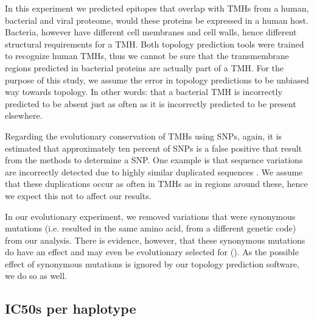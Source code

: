 In this experiment we predicted epitopes that overlap with 
TMHs from a human, bacterial and viral proteome,
would these proteins be expressed in a human host.
Bacteria, however have different cell membranes and cell walls, 
hence different structural requirements for a TMH.
Both topology prediction tools were trained to recognize
human TMHs, thus we cannot be sure that
the transmembrane regions predicted in bacterial proteins
are actually part of a TMH.
For the purpose of this study, we assume the 
error in topology predictions to be unbiased way towards topology.
In other words: that a bacterial TMH is incorrectly
predicted to be absent just as often as it is incorrectly
predicted to be present elsewhere.


Regarding the evolutionary conservation of TMHs using SNPs,
again, it is estimated that approximately ten percent
of SNPs is a false positive that result from the methods to determine
a SNP. One example is that sequence variations are incorrectly
detected due to highly similar duplicated sequences \cite{musumeci2010single}.
We assume that these duplications occur as often in TMHs as in
regions around these, hence we expect this not to affect our results.

%
In our evolutionary experiment, 
we removed variations that were synonymous mutations (i.e.
resulted in the same amino acid, from a different genetic code) 
from our analysis.
There is evidence, however, that these synonymous mutations
do have an effect and may even be evolutionary selected 
for (\cite{hunt2009silent}).
As the possible effect of synonymous mutations is ignored by our
topology prediction software, we do so as well.

\subsection{IC50s per haplotype}
\label{subsec:ic50s_per_haplotype}

